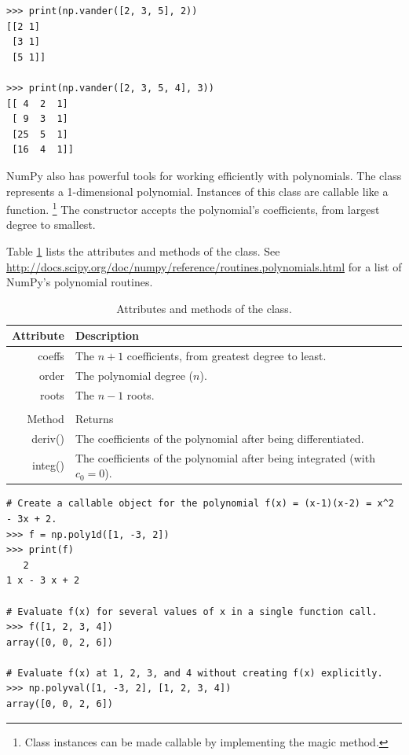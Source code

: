 \begin{lstlisting}
>>> print(np.vander([2, 3, 5], 2))
[[2 1]
 [3 1]
 [5 1]]

>>> print(np.vander([2, 3, 5, 4], 3))
[[ 4  2  1]
 [ 9  3  1]
 [25  5  1]
 [16  4  1]]
\end{lstlisting}

NumPy also has powerful tools for working efficiently with polynomials.
The class  represents a 1-dimensional polynomial.
Instances of this class are callable like a function.%
\footnote{Class instances can be made callable by implementing the  magic method.}
The constructor accepts the polynomial's coefficients, from largest degree to smallest.

Table \ref{table:numpy-poly1d} lists the attributes and methods of the  class.
See \url{http://docs.scipy.org/doc/numpy/reference/routines.polynomials.html} for a list of NumPy's polynomial routines.

\begin{table}[H]
\begin{tabular}{r|l}
    Attribute & Description \\
    \hline
    coeffs & The $n+1$ coefficients, from greatest degree to least. \\
    order & The polynomial degree ($n$). \\
    roots & The $n-1$ roots. \\
    \\
    Method & Returns \\
    \hline
    deriv() & The coefficients of the polynomial after being differentiated. \\
    integ() & The coefficients of the polynomial after being integrated (with $c_0 = 0$).
\end{tabular}
\caption{Attributes and methods of the  class.}
\label{table:numpy-poly1d}
\end{table}
%
\begin{lstlisting}
# Create a callable object for the polynomial f(x) = (x-1)(x-2) = x^2 - 3x + 2.
>>> f = np.poly1d([1, -3, 2])
>>> print(f)
   2
1 x - 3 x + 2

# Evaluate f(x) for several values of x in a single function call.
>>> f([1, 2, 3, 4])
array([0, 0, 2, 6])

# Evaluate f(x) at 1, 2, 3, and 4 without creating f(x) explicitly.
>>> np.polyval([1, -3, 2], [1, 2, 3, 4])
array([0, 0, 2, 6])
\end{lstlisting}

